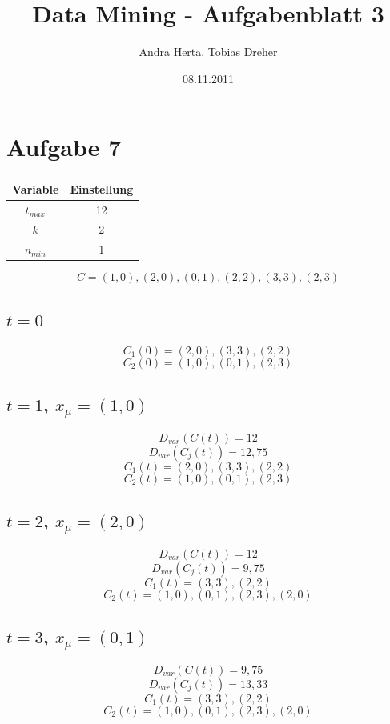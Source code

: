 \title{Data Mining - Aufgabenblatt 3}
\author{Andra Herta, Tobias Dreher}
\date{08.11.2011}

 


\maketitle

\section*{Aufgabe 7}
\begin{table}[htb]
  \centering
  \begin{tabular}{c|c}
    \textbf{Variable} & \textbf{Einstellung}\\
    \hline
    $t_{max}$ & 12\\
    $k$ & 2\\
    $n_{min}$ & 1\\
  \end{tabular}
\end{table}

\[C = {(1,0),(2,0),(0,1),(2,2),(3,3),(2,3)}\]

\subsection*{$t = 0$}
\[C_{1}(0) = {(2,0),(3,3),(2,2)}\]
\[C_{2}(0) = {(1,0),(0,1),(2,3)}\]

\subsection*{$t = 1$, $x_{\mu} = (1,0)$}
\[D_{var}(C(t)) = 12\]
\[D_{var}(C_{j}(t)) = 12,75\]
\[C_{1}(t) = {(2,0),(3,3),(2,2)}\]
\[C_{2}(t) = {(1,0),(0,1),(2,3)}\]

\subsection*{$t = 2$, $x_{\mu} = (2,0)$}
\[D_{var}(C(t)) = 12\]
\[D_{var}(C_{j}(t)) = 9,75\]
\[C_{1}(t) = {(3,3),(2,2)}\]
\[C_{2}(t) = {(1,0),(0,1),(2,3),(2,0)}\]

\subsection*{$t = 3$, $x_{\mu} = (0,1)$}
\[D_{var}(C(t)) = 9,75\]
\[D_{var}(C_{j}(t)) = 13,33\]
\[C_{1}(t) = {(3,3),(2,2)}\]
\[C_{2}(t) = {(1,0),(0,1),(2,3),(2,0)}\]

